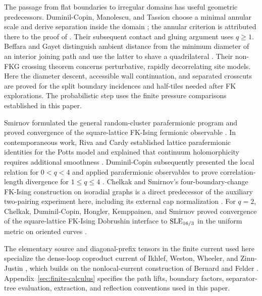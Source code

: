 The passage from flat boundaries to irregular domains has useful
geometric predecessors. Duminil-Copin, Manolescu, and Tassion choose a
minimal annular scale and derive separation inside the domain
\cite[Section~4, Fact~4.1]{DuminilCopinManolescuTassion2021}; the annular
criterion is attributed there to the proof of
\cite[Proposition~2.6]{KemppainenSmirnov2017}. Their subsequent contact
and gluing argument uses $q\ge1$. Beffara and Gayet distinguish ambient
distance from the minimum diameter of an interior joining path and use
the latter to shave a quadrilateral
\cite[Definitions~5--6 and Lemma~20]{BeffaraGayet2026}.
Their non-FKG crossing theorem concerns perturbative, rapidly
decorrelating site models. Here the diameter descent, accessible wall
continuation, and separated crosscuts are proved for the split boundary
incidences and half-tiles needed after FK explorations. The probabilistic
step uses the finite pressure comparisons established in this paper.

Smirnov formulated the general random-cluster parafermionic program and
proved convergence of the square-lattice FK-Ising fermionic observable
\cite[Theorem~2.2 and Conjecture~2.6]{Smirnov2010}.  In contemporaneous
work, Riva and Cardy established lattice parafermionic identities for
the Potts model and explained that continuum holomorphicity requires
additional smoothness \cite[Sections~3.1 and~4.2]{RivaCardy2006}.
Duminil-Copin subsequently presented the local relation for $0<q<4$
and applied parafermionic observables to prove correlation-length
divergence for $1\le q\le4$
\cite[Proposition~4 and Theorem~1]{DuminilCopin2012Parafermion}.
Chelkak and Smirnov's four-boundary-change FK-Ising construction on
isoradial graphs is a direct predecessor of the auxiliary two-pairing
experiment here, including its external cap normalization
\cite[Section~6]{ChelkakSmirnov2012}.  For $q=2$, Chelkak,
Duminil-Copin, Hongler, Kemppainen, and Smirnov proved convergence
of the square-lattice FK-Ising Dobrushin interface to
$\operatorname{SLE}_{16/3}$ in the uniform metric on oriented curves
\cite[Theorem~2]{ChelkakDCHonglerKemppainenSmirnov2014}.

The elementary source and diagonal-prefix tensors in the finite current
used here specialize the dense-loop coproduct current of Ikhlef, Weston,
Wheeler, and Zinn-Justin
\cite[Sections~2.3, 2.5.1, 3.1--3.2, and~4.1]{IkhlefWestonWheelerZinnJustin2013},
which builds on the nonlocal-current construction of Bernard and Felder
\cite{BernardFelder1991}.  Appendix~\ref{sec:finite-calculus} specifies
the path lifts, boundary factors, separator-tree evaluation, extraction,
and reflection conventions used in this paper.


